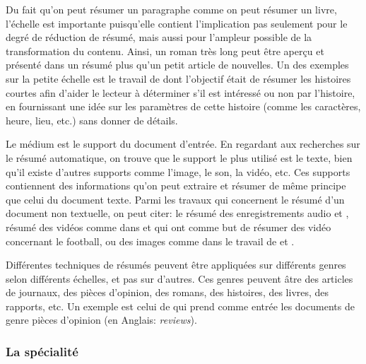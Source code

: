 \documentclass[a4paper,12pt,oneside]{../use/ESIthesis}
\begin{document}
Du fait qu'on peut résumer un paragraphe comme on peut résumer un livre, l'échelle est importante puisqu'elle contient l'implication pas seulement pour le degré de réduction de résumé, mais aussi pour l'ampleur possible de la transformation du contenu. 
Ainsi, un roman très long peut être aperçu et présenté dans un résumé plus qu'un petit article de nouvelles. 
Un des exemples sur la petite échelle est le travail de \cite{06-kazantseva} dont l'objectif était de résumer les histoires courtes afin d'aider le lecteur à déterminer s'il est intéressé ou non par l'histoire, en fournissant une idée sur les paramètres de cette histoire (comme les caractères, heure, lieu, etc.) sans donner de détails.

Le médium est le support du document d'entrée. 
En regardant aux recherches sur le résumé automatique, on trouve que le support le plus utilisé est le texte, bien qu'il existe d'autres supports comme l'image, le son, la vidéo, etc. 
Ces supports contiennent des informations qu'on peut extraire et résumer de même principe que celui du document texte. 
Parmi les travaux qui concernent le résumé d'un document non textuelle, on peut citer: le résumé des enregistrements audio \cite{01-hori-furui} et \cite{04-Inoue-al}, résumé des vidéos comme dans \cite{03-ekin-al} et \cite{06-albanese-al} qui ont comme but de résumer des vidéo concernant le football, ou des images comme dans le travail de \cite{02-carson-al} et \cite{03-feifei-al}.

Différentes techniques de résumés peuvent être appliquées sur différents genres selon différents échelles, et pas sur d'autres. 
Ces genres peuvent âtre des articles de journaux, des pièces d'opinion, des romans, des histoires, des livres, des rapports, etc. 
Un exemple est celui de \cite{09-zhan-al} qui prend comme entrée les documents de genre pièces d'opinion (en Anglais: \textit{reviews}).

\subsubsection{La spécialité}
\end{document}

